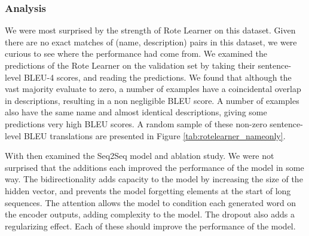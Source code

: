 \subsubsection{Analysis} %
We were most surprised by the strength of Rote Learner on this dataset. Given there are no exact matches of (name, description) pairs in this dataset, we were curious to see where the performance had come from.
We examined the predictions of the Rote Learner on the validation set by taking their sentence-level BLEU-4 scores, and reading the predictions.
We found that although the vast majority evaluate to zero, a number of examples have a coincidental overlap in descriptions, resulting in a non negligible BLEU score. 
A number of examples also have the same name and almost identical descriptions, giving some predictions very high BLEU scores.
A random sample of these non-zero sentence-level BLEU translations are presented in Figure \ref{tab:rotelearner_nameonly}.





With then examined the Seq2Seq model and ablation study. We were not surprised that the additions each improved the performance of the model in some way. The bidirectionality adds capacity to the model by increasing the size of the hidden vector, and prevents the model forgetting elements at the start of long sequences. The attention allows the model to condition each generated word on the encoder outputs, adding complexity to the model.
The dropout also adds a regularizing effect.
Each of these should improve the performance of the model.


